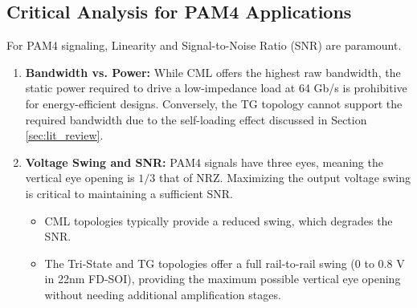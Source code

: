 \documentclass[12pt, a4paper]{report}
\begin{document}
\begin{table}[htbp]
    \centering
    \caption{Comparative Analysis of Multiplexer Topologies for High-Speed SerDes}
    \label{tab:topology_comparison}
    \renewcommand{\arraystretch}{1.3} %
    
\end{table}

\subsection{Critical Analysis for PAM4 Applications}
For PAM4 signaling, Linearity and Signal-to-Noise Ratio (SNR) are paramount.

\begin{enumerate}
    \item \textbf{Bandwidth vs. Power:} While CML offers the highest raw bandwidth, the static power required to drive a low-impedance load at 64 Gb/s is prohibitive for energy-efficient designs. Conversely, the TG topology cannot support the required bandwidth due to the self-loading effect discussed in Section \ref{sec:lit_review}.
    
    \item \textbf{Voltage Swing and SNR:} PAM4 signals have three eyes, meaning the vertical eye opening is $1/3$ that of NRZ. Maximizing the output voltage swing is critical to maintaining a sufficient SNR. 
    \begin{itemize}
        \item CML topologies typically provide a reduced swing, which degrades the SNR.
        \item The Tri-State and TG topologies offer a full rail-to-rail swing ($0$ to $0.8$ V in 22nm FD-SOI), providing the maximum possible vertical eye opening without needing additional amplification stages.
    \end{itemize}
\end{enumerate}
\end{document}
